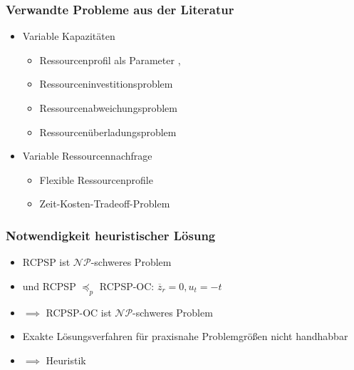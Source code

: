 \begin{frame}[noframenumbering]
\frametitle{Verwandte Probleme aus der Literatur}
\begin{itemize}
\item Variable Kapazitäten
\begin{itemize}
\item Ressourcenprofil als Parameter {\footnotesize \cite{Klein2000}, \cite{Hartmann2012}}
\item Ressourceninvestitionsproblem {\footnotesize \cite{Mohring1984}}
\item Ressourcenabweichungsproblem {\footnotesize \cite{Neumann2003}} 
\item Ressourcenüberladungsproblem {\footnotesize \cite{Neumann2003}}
\end{itemize}
\vspace*{4mm}
\item Variable Ressourcennachfrage
\begin{itemize}
\item Flexible Ressourcenprofile {\footnotesize \cite{Ranjbar2010}}
\item Zeit-Kosten-Tradeoff-Problem {\footnotesize \cite{Demeulemeester1996}}
\end{itemize}
\end{itemize}

\end{frame}



\begin{frame}[noframenumbering]
	\frametitle{Notwendigkeit heuristischer Lösung}
	\begin{itemize}
		\item RCPSP ist $\mathcal{NP}$-schweres Problem
		\item und RCPSP $\preceq_p$ RCPSP-OC: $\overline{z}_{r}=0, u_t=-t$
		\item[] $\implies$ RCPSP-OC ist $\mathcal{NP}$-schweres Problem\\[10mm]
		\item Exakte Lösungsverfahren für praxisnahe Problemgrößen nicht handhabbar
		\item[] $\implies$ Heuristik
	\end{itemize}
\end{frame}

